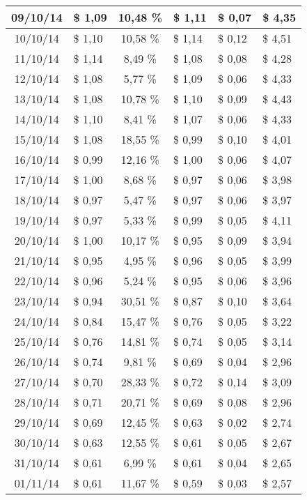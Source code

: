 \begin{center}
\begin{small}
\begin{longtable}{|c|l|c|l|l|l|}
09/10/14 & \$ 1,09 & 10,48 \% & \$ 1,11 & \$ 0,07 & \$ 4,35 \\ \hline
10/10/14 & \$ 1,10 & 10,58 \% & \$ 1,14 & \$ 0,12 & \$ 4,51 \\ \hline
11/10/14 & \$ 1,14 & 8,49 \% & \$ 1,08 & \$ 0,08 & \$ 4,28 \\ \hline
12/10/14 & \$ 1,08 & 5,77 \% & \$ 1,09 & \$ 0,06 & \$ 4,33 \\ \hline
13/10/14 & \$ 1,08 & 10,78 \% & \$ 1,10 & \$ 0,09 & \$ 4,43 \\ \hline
14/10/14 & \$ 1,10 & 8,41 \% & \$ 1,07 & \$ 0,06 & \$ 4,33 \\ \hline
15/10/14 & \$ 1,08 & 18,55 \% & \$ 0,99 & \$ 0,10 & \$ 4,01 \\ \hline
16/10/14 & \$ 0,99 & 12,16 \% & \$ 1,00 & \$ 0,06 & \$ 4,07 \\ \hline
17/10/14 & \$ 1,00 & 8,68 \% & \$ 0,97 & \$ 0,06 & \$ 3,98 \\ \hline
18/10/14 & \$ 0,97 & 5,47 \% & \$ 0,97 & \$ 0,06 & \$ 3,97 \\ \hline
19/10/14 & \$ 0,97 & 5,33 \% & \$ 0,99 & \$ 0,05 & \$ 4,11 \\ \hline
20/10/14 & \$ 1,00 & 10,17 \% & \$ 0,95 & \$ 0,09 & \$ 3,94 \\ \hline
21/10/14 & \$ 0,95 & 4,95 \% & \$ 0,96 & \$ 0,05 & \$ 3,99 \\ \hline
22/10/14 & \$ 0,96 & 5,24 \% & \$ 0,95 & \$ 0,06 & \$ 3,96 \\ \hline
23/10/14 & \$ 0,94 & 30,51 \% & \$ 0,87 & \$ 0,10 & \$ 3,64 \\ \hline
24/10/14 & \$ 0,84 & 15,47 \% & \$ 0,76 & \$ 0,05 & \$ 3,22 \\ \hline
25/10/14 & \$ 0,76 & 14,81 \% & \$ 0,74 & \$ 0,05 & \$ 3,14 \\ \hline
26/10/14 & \$ 0,74 & 9,81 \% & \$ 0,69 & \$ 0,04 & \$ 2,96 \\ \hline
27/10/14 & \$ 0,70 & 28,33 \% & \$ 0,72 & \$ 0,14 & \$ 3,09 \\ \hline
28/10/14 & \$ 0,71 & 20,71 \% & \$ 0,69 & \$ 0,08 & \$ 2,96 \\ \hline
29/10/14 & \$ 0,69 & 12,45 \% & \$ 0,63 & \$ 0,02 & \$ 2,74 \\ \hline
30/10/14 & \$ 0,63 & 12,55 \% & \$ 0,61 & \$ 0,05 & \$ 2,67 \\ \hline
31/10/14 & \$ 0,61 & 6,99 \% & \$ 0,61 & \$ 0,04 & \$ 2,65 \\ \hline
01/11/14 & \$ 0,61 & 11,67 \% & \$ 0,59 & \$ 0,03 & \$ 2,57 \\ \hline

\end{longtable}
\end{small}
\end{center}
